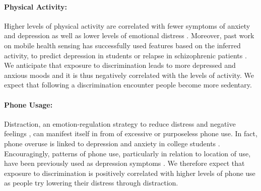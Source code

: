 \paragraph{Physical Activity:}
\label{sec:back-mhealth-activity}
Higher levels of physical activity are correlated with fewer symptoms of anxiety and depression \cite{Stephens:1988} as well as lower levels of emotional distress \cite{Steptoe:1996}. Moreover, past work on mobile health sensing has successfully used features based on the inferred activity, \eg to predict depression in students \cite{Wang:2018} or relapse in schizophrenic patients \cite{Wang:2016}. We anticipate that exposure to discrimination leads to more depressed and anxious moods and it is thus negatively correlated with the levels of activity. We expect that following a discrimination encounter people become more sedentary. 

\paragraph{Phone Usage:}
\label{sec:back-mhealth-phone}
Distraction, an emotion-regulation strategy to reduce distress and negative feelings \cite{Sheppes:2011}, can manifest itself in from of excessive or purposeless phone use. In fact, phone overuse is linked to depression and anxiety in college students \cite{Demirci:2015}. Encouragingly, patterns of phone use, particularly in relation to location of use, have been previously used as depression symptoms \cite{Wang:2018}. We therefore expect that exposure to discrimination is positively correlated with higher levels of phone use as people try lowering their distress through distraction.

